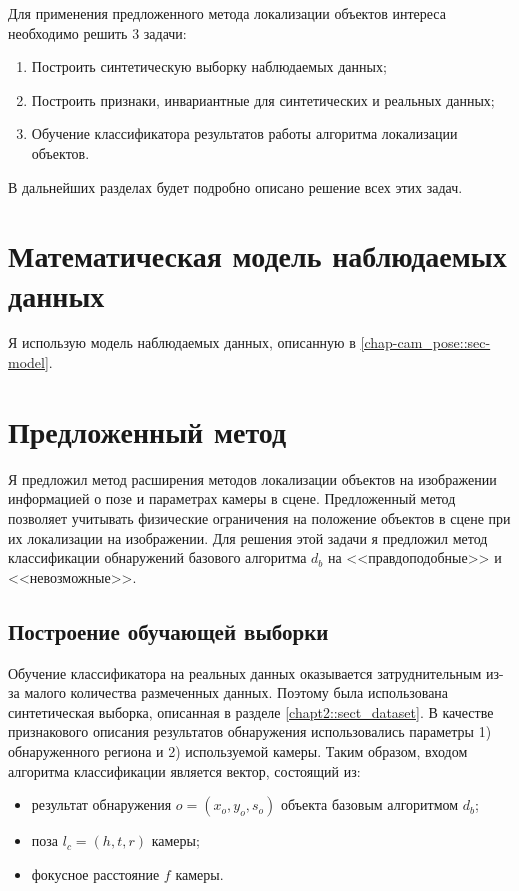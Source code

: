 Для применения предложенного метода локализации объектов интереса необходимо решить 3 задачи:
\begin{enumerate}
	\item Построить синтетическую выборку наблюдаемых данных;
	\item Построить признаки, инвариантные для синтетических и реальных данных;
	\item Обучение классификатора результатов работы алгоритма локализации объектов.
\end{enumerate}
В дальнейших разделах будет подробно описано решение всех этих задач.

\section{Математическая модель наблюдаемых данных}

Я использую модель наблюдаемых данных, описанную в \ref{chap-cam_pose::sec-model}.

\section{Предложенный метод}

Я предложил метод расширения методов локализации объектов на изображении информацией о позе и параметрах камеры в сцене. Предложенный метод позволяет учитывать физические ограничения на положение объектов в сцене при их локализации на изображении. Для решения этой задачи я предложил метод классификации обнаружений базового алгоритма $d_b$ на <<правдоподобные>> и <<невозможные>>.

\subsection{Построение обучающей выборки}

Обучение классификатора на реальных данных оказывается затруднительным из-за малого количества размеченных данных. Поэтому была использована синтетическая выборка, описанная в разделе \ref{chapt2::sect_dataset}. В качестве признакового описания результатов обнаружения использовались параметры 1) обнаруженного региона и 2) используемой камеры. Таким образом, входом алгоритма классификации является вектор, состоящий из:
\begin{itemize}
	\item результат обнаружения $o = (x_o, y_o, s_o)$ объекта базовым алгоритмом $d_b$;
	\item поза $l_c = (h, t, r)$ камеры;
	\item фокусное расстояние $f$ камеры.
\end{itemize}

